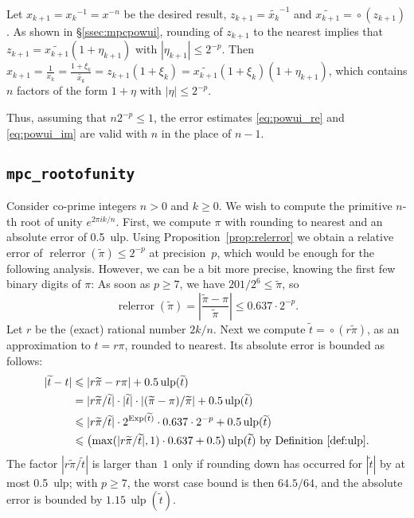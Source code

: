 \documentclass [11pt]{article}
\newcommand {\corr}[1]{{#1}}
\newcommand {\appro}[1]{\widetilde {#1}}
\newcommand {\ulp}[1]{#1~ulp}
\newcommand {\Ulp}{{\operatorname {ulp}}}
\DeclareMathOperator{\Exp}{\operatorname {Exp}}
\newcommand{\relerror}{\operatorname {relerror}}
\newcommand {\round}{\operatorname {\circ}}
\renewcommand {\leq}{\leqslant}
\renewcommand {\geq}{\geqslant}
\begin{document}
Let $\corr {x_{k+1}} = \corr {x_k}^{-1} = x^{-n}$ be the desired
result, $z_{k+1} = \appro {x_k}^{-1}$
and $\appro {x_{k+1}} = \round (z_{k+1})$. As shown in \S\ref {ssec:mpcpowui},
rounding of $z_{k+1}$ to the nearest implies that
$z_{k+1} = \appro {x_{k+1}} (1 + \eta_{k+1})$ with
$|\eta_{k+1}| \leq 2^{-p}$.
Then $\corr {x_{k+1}} = \frac {1}{x_k}
= \frac {1 + \xi_k}{\appro {x_k}}
= z_{k+1} (1 + \xi_k)
= \appro {x_{k+1}} (1 + \xi_k)(1 + \eta_{k+1})$,
which contains $n$ factors of the form $1 + \eta$ with
$|\eta| \leq 2^{-p}$.

Thus, assuming that $n 2^{-p} \leq 1$, the error estimates
\eqref {eq:powui_re} and \eqref {eq:powui_im} are valid with $n$
in the place of $n - 1$.


\subsection {\texttt {mpc\_rootofunity}}

Consider co-prime integers $n > 0$ and $k \geq 0$. We wish to compute
the primitive $n$-th root of unity $e^{2 \pi i k / n}$.
First, we compute $\pi$ with rounding to nearest and an absolute error
of \ulp{0.5}. Using Proposition~\ref {prop:relerror} we obtain a relative
error of $\relerror (\appro {\pi}) \leq 2^{-p}$ at precision~$p$, which
would be enough for the following analysis. However, we can be a bit more
precise, knowing the first few binary digits of $\pi$: As soon as $p \geq 7$,
we have $201/2^6 \leq \appro {\pi}$, so
\[
\relerror (\appro {\pi})
= \left| \frac {\appro {\pi} - \corr {\pi}}{\appro {\pi}} \right|
\leq 0.637 \cdot 2^{-p}.
\]
Let $r$ be the (exact) rational number $2k/n$.
Next we compute
$\appro {t} = \round (r \appro {\pi})$, as an approximation to
$\corr {t} = r \pi$, rounded to nearest.
Its absolute error is bounded as follows:
\begin {align*}
| \appro {t} - \corr {t} |
& \leq |r \appro {\pi} - r \corr {\pi}| + 0.5 \, \Ulp (\appro {t}) \\
& =  |r \appro {\pi} / \appro {t}| \cdot |\appro {t}|
     \cdot |(\appro {\pi} - \corr {\pi}) / \appro {\pi}|
     + 0.5 \, \Ulp (\appro {t}) \\
& \leq |r \appro {\pi} / \appro {t}| \cdot 2^{\Exp (\appro {t})}
     \cdot 0.637 \cdot 2^{-p} + 0.5 \, \Ulp (\appro {t}) \\
& \leq \left( \max (|r \appro {\pi} / \appro {t}|, 1) \cdot 0.637
              + 0.5 \right) \Ulp (\appro {t})
  \text { by Definition~\ref {def:ulp}}.
\end {align*}
The factor $|r \appro {\pi} / \appro {t}|$ is larger than~$1$ only if
rounding down has occurred for $|\appro {t}|$ by at most \ulp {0.5};
with $p \geq 7$, the worst case bound is then $64.5/64$,
and the absolute error is bounded by $1.15 \, \Ulp (\appro {t})$.
\end{document}
